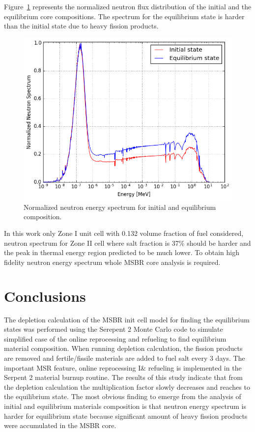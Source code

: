 \documentclass{anstrans}
\begin{document}
Figure~\ref{fig:spectrum} represents the normalized neutron flux distribution of the initial and the equilibrium core compositions. The spectrum for the equilibrium state is harder than the initial state due to heavy fission products. 
\begin{figure}[hb] %
  \centering
  \vspace{-0.85em}
  \includegraphics[width=1.04\linewidth]{spectrum.png}
  \vspace{-0.6em}
  \caption{Normalized neutron energy spectrum for initial and equilibrium composition.}
  \label{fig:spectrum}
  \vspace{-0.10em}
\end{figure}

In this work only Zone I unit cell with 0.132 volume fraction of fuel considered, neutron spectrum for Zone II cell where salt fraction is 37\% should be harder and the peak in thermal energy region predicted to be much lower. To obtain high fidelity neutron energy spectrum whole \gls{MSBR} core analysis is required.
\section{Conclusions}
The depletion calculation of the \gls{MSBR} init cell model for finding the equilibrium states was performed using the Serepent 2 Monte Carlo code to simulate simplified case of the online reprocessing and refueling to find equilibrium material composition. When running depletion calculation, the fission products are removed and fertile/fissile materials are added to fuel salt every 3 days. The important MSR feature, online reprocessing I\& refueling is implemented in the Serpent 2 material burnup routine. The results of this study indicate that from the depletion calculation the multiplication factor slowly decreases and reaches to the equilibrium state. The most obvious finding to emerge from the analysis of initial and equilibrium materials composition is that neutron energy spectrum is harder for equilibrium state because significant amount of heavy fission products were accumulated in the \gls{MSBR} core.
\end{document}
